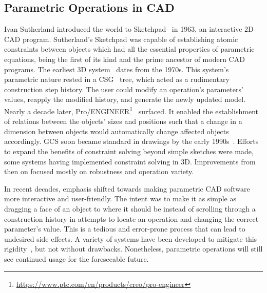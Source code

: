 \subsection{Parametric Operations in CAD}%
\label{sec:intro.parametric}

Ivan Sutherland introduced the world to
Sketchpad~\cite{Sutherland:1964:Sketchpad} in 1963, an interactive 2D \ac{CAD}
program.  Sutherland's Sketchpad was capable of establishing atomic constraints
between objects which had all the essential properties of parametric equations,
being the first of its kind and the prime ancestor of modern \ac{CAD} programs.
The earliest 3D system~\cite{Requicha:1980:RRS:356827.356833} dates from the
1970s.  This system's parametric nature rested in a
\ac{CSG}~\cite{Requicha:1977:CSG,Foley:1996:CGPP} tree, which acted as a
rudimentary construction step history.  The user could modify an operation's
parameters' values, reapply the modified history, and generate the newly updated
model.  Nearly a decade later,
Pro/ENGINEER\footnote{\url{https://www.ptc.com/en/products/creo/pro-engineer}}~\cite{Jabi:2013:PDA}
surfaced.  It enabled the establishment of relations between the objects' sizes
and positions such that a change in a dimension between objects would
automatically change affected objects accordingly.  \Ac{GCS} soon became
standard in drawings by the early
1990s~\cite{Chung:1990:TEVPD,Owen:1991:ASGDC,Bouma:1995:GCS}.  Efforts to expand
the benefits of constraint solving beyond simple sketches were made, some
systems having implemented constraint solving in 3D.  Improvements from then on
focused mostly on robustness and operation variety.

In recent decades, emphasis shifted towards making parametric \ac{CAD} software
more interactive and user-friendly.  The intent was to make it as simple as
dragging a face of an object to where it should be instead of scrolling through
a construction history in attempts to locate an operation and changing the
correct parameter's value.  This is a tedious and error-prone process that can
lead to undesired side effects.  A variety of systems have been developed to
mitigate this rigidity~\cite{Samuel:2006:CPPUP,Wu:2007:MSMSM,Clarke:2009:SM},
but not without drawbacks.  Nonetheless, parametric operations will still see
continued usage for the foreseeable future.
